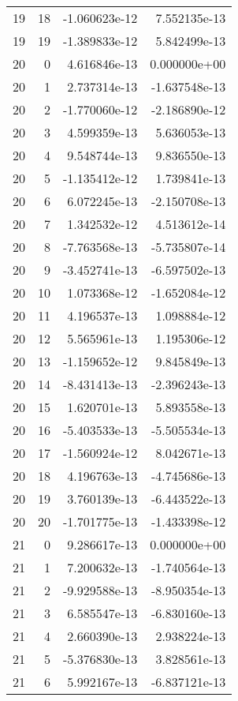 \begin{tabular}{rrrr}
  19 &   18 & -1.060623e-12 &  7.552135e-13 \\
  19 &   19 & -1.389833e-12 &  5.842499e-13 \\
  20 &    0 &  4.616846e-13 &  0.000000e+00 \\
  20 &    1 &  2.737314e-13 & -1.637548e-13 \\
  20 &    2 & -1.770060e-12 & -2.186890e-12 \\
  20 &    3 &  4.599359e-13 &  5.636053e-13 \\
  20 &    4 &  9.548744e-13 &  9.836550e-13 \\
  20 &    5 & -1.135412e-12 &  1.739841e-13 \\
  20 &    6 &  6.072245e-13 & -2.150708e-13 \\
  20 &    7 &  1.342532e-12 &  4.513612e-14 \\
  20 &    8 & -7.763568e-13 & -5.735807e-14 \\
  20 &    9 & -3.452741e-13 & -6.597502e-13 \\
  20 &   10 &  1.073368e-12 & -1.652084e-12 \\
  20 &   11 &  4.196537e-13 &  1.098884e-12 \\
  20 &   12 &  5.565961e-13 &  1.195306e-12 \\
  20 &   13 & -1.159652e-12 &  9.845849e-13 \\
  20 &   14 & -8.431413e-13 & -2.396243e-13 \\
  20 &   15 &  1.620701e-13 &  5.893558e-13 \\
  20 &   16 & -5.403533e-13 & -5.505534e-13 \\
  20 &   17 & -1.560924e-12 &  8.042671e-13 \\
  20 &   18 &  4.196763e-13 & -4.745686e-13 \\
  20 &   19 &  3.760139e-13 & -6.443522e-13 \\
  20 &   20 & -1.701775e-13 & -1.433398e-12 \\
  21 &    0 &  9.286617e-13 &  0.000000e+00 \\
  21 &    1 &  7.200632e-13 & -1.740564e-13 \\
  21 &    2 & -9.929588e-13 & -8.950354e-13 \\
  21 &    3 &  6.585547e-13 & -6.830160e-13 \\
  21 &    4 &  2.660390e-13 &  2.938224e-13 \\
  21 &    5 & -5.376830e-13 &  3.828561e-13 \\
  21 &    6 &  5.992167e-13 & -6.837121e-13 \\

\end{tabular}
